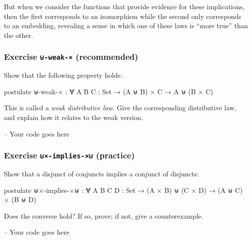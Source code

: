 But when we consider the functions that provide evidence for these
implications, then the first corresponds to an isomorphism while the
second only corresponds to an embedding, revealing a sense in which one
of these laws is ``more true'' than the other.

\hypertarget{exercise--weak--recommended}{%
\subsubsection{\texorpdfstring{Exercise \texttt{⊎-weak-×}
(recommended)}{Exercise ⊎-weak-× (recommended)}}\label{exercise--weak--recommended}}

Show that the following property holds:

\begin{fence}
\begin{code}
postulate
  ⊎-weak-× : ∀ {A B C : Set} → (A ⊎ B) × C → A ⊎ (B × C)
\end{code}
\end{fence}

This is called a \emph{weak distributive law}. Give the corresponding
distributive law, and explain how it relates to the weak version.

\begin{fence}
\begin{code}
-- Your code goes here
\end{code}
\end{fence}

\hypertarget{exercise--implies--practice}{%
\subsubsection{\texorpdfstring{Exercise \texttt{⊎×-implies-×⊎}
(practice)}{Exercise ⊎×-implies-×⊎ (practice)}}\label{exercise--implies--practice}}

Show that a disjunct of conjuncts implies a conjunct of disjuncts:

\begin{fence}
\begin{code}
postulate
  ⊎×-implies-×⊎ : ∀ {A B C D : Set} → (A × B) ⊎ (C × D) → (A ⊎ C) × (B ⊎ D)
\end{code}
\end{fence}

Does the converse hold? If so, prove; if not, give a counterexample.

\begin{fence}
\begin{code}
-- Your code goes here
\end{code}
\end{fence}

